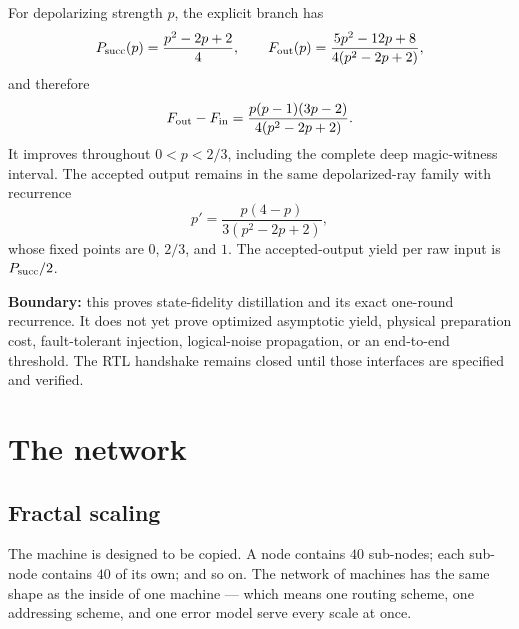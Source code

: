 \begin{spec}
For depolarizing strength $p$, the explicit branch has
\[
 P_{\rm succ}(p)=\frac{p^2-2p+2}{4},\qquad
 F_{\rm out}(p)=\frac{5p^2-12p+8}{4(p^2-2p+2)},
\]
and therefore
\[
 F_{\rm out}-F_{\rm in}
 =\frac{p(p-1)(3p-2)}{4(p^2-2p+2)}.
\]
It improves throughout $0<p<2/3$, including the complete deep magic-witness interval.
The accepted output remains in the same depolarized-ray family with recurrence
\[
 p'=\frac{p(4-p)}{3(p^2-2p+2)},
\]
whose fixed points are $0$, $2/3$, and $1$. The accepted-output yield per raw input is
$P_{\rm succ}/2$.

\smallskip\noindent
\textbf{Boundary:} this proves state-fidelity distillation and its exact one-round
recurrence. It does not yet prove optimized asymptotic yield, physical preparation cost,
fault-tolerant injection, logical-noise propagation, or an end-to-end threshold. The RTL
handshake remains closed until those interfaces are specified and verified.
\end{spec}

\section{The network}\label{sec:network}

\subsection{Fractal scaling}

\begin{plain}
The machine is designed to be copied. A node contains $40$ sub-nodes; each sub-node
contains $40$ of its own; and so on. The network of machines has the same shape as the
inside of one machine --- which means one routing scheme, one addressing scheme, and one
error model serve every scale at once.
\end{plain}

